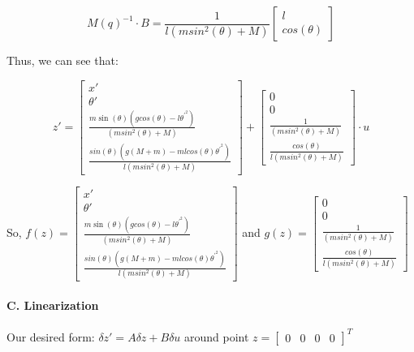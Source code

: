 \documentclass{article}
\begin{document}
    $$
        M(q)^{-1} \cdot B = \frac{1}{l(msin^2(\theta)+ M)}
        \begin{bmatrix}
            l \\ cos(\theta)
        \end{bmatrix}
    $$
    
    Thus, we can see that:
    
    $$
    z' = 
    \begin{bmatrix}
    x' \\
    \theta' \\
    \frac{ m \sin(\theta) (gcos(\theta)-l\theta^{\prime^2})}{(msin^2(\theta)+ M)} \\
    \frac{sin(\theta) (g(M+m)-mlcos(\theta)\theta^{\prime^2})}{l(msin^2(\theta)+ M)}
    \end{bmatrix}
    +
    \begin{bmatrix}
    0 \\
    0 \\
    \frac{1}{(msin^2(\theta)+ M)} \\
    \frac{cos(\theta)}{l(msin^2(\theta)+ M)}
    \end{bmatrix} \cdot u
    $$
    
    So, $f(z) =  \begin{bmatrix}
    x' \\
    \theta' \\
    \frac{ m \sin(\theta) (gcos(\theta)-l\theta^{\prime^2})}{(msin^2(\theta)+ M)} \\
    \frac{sin(\theta) (g(M+m)-mlcos(\theta)\theta^{\prime^2})}{l(msin^2(\theta)+ M)}
    \end{bmatrix}$ and $g(z) = \begin{bmatrix}
    0 \\
    0 \\
    \frac{1}{(msin^2(\theta)+ M)} \\
    \frac{cos(\theta)}{l(msin^2(\theta)+ M)}
    \end{bmatrix} $
    
    \paragraph{C. Linearization}
    
   \leavevmode
    
   \noindent
   
   Our desired form: $\delta z' = A\delta z + B\delta u$ around point 
   $z =  \begin{bmatrix}
    0 & 0 & 0 & 0
    \end{bmatrix}^T
    $
   
\end{document}

